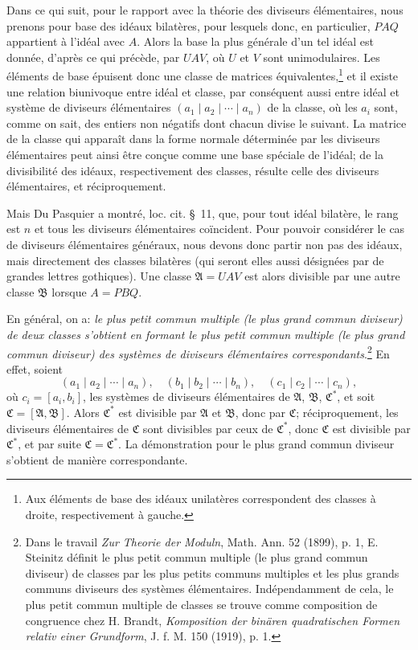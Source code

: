 Dans ce qui suit, pour le rapport avec la théorie des diviseurs élémentaires, nous prenons pour base des idéaux bilatères, pour lesquels donc, en particulier, $PAQ$ appartient à l'idéal avec $A$. Alors la base la plus générale d'un tel idéal est donnée, d'après ce qui précède, par $UAV$, où $U$ et $V$ sont unimodulaires. Les éléments de base épuisent donc une classe de matrices équivalentes,\footnote{Aux éléments de base des idéaux unilatères correspondent des classes à droite, respectivement à gauche.} et il existe une relation biunivoque entre idéal et classe, par conséquent aussi entre idéal et système de diviseurs élémentaires $(a_1\mid a_2\mid\cdots\mid a_n)$ de la classe, où les $a_i$ sont, comme on sait, des entiers non négatifs dont chacun divise le suivant. La matrice de la classe qui apparaît dans la forme normale déterminée par les diviseurs élémentaires peut ainsi être conçue comme une base spéciale de l'idéal; de la divisibilité des idéaux, respectivement des classes, résulte celle des diviseurs élémentaires, et réciproquement.

Mais Du Pasquier a montré, loc. cit. \S~11, que, pour tout idéal bilatère, le rang est $n$ et tous les diviseurs élémentaires coïncident. Pour pouvoir considérer le cas de diviseurs élémentaires généraux, nous devons donc partir non pas des idéaux, mais directement des classes bilatères (qui seront elles aussi désignées par de grandes lettres gothiques). Une classe $\mathfrak A=UAV$ est alors divisible par une autre classe $\mathfrak B$ lorsque $A=PBQ$.

En général, on a: \emph{le plus petit commun multiple (le plus grand commun diviseur) de deux classes s'obtient en formant le plus petit commun multiple (le plus grand commun diviseur) des systèmes de diviseurs élémentaires correspondants}.\footnote{Dans le travail \emph{Zur Theorie der Moduln}, Math. Ann. 52 (1899), p. 1, E. Steinitz définit le plus petit commun multiple (le plus grand commun diviseur) de classes par les plus petits communs multiples et les plus grands communs diviseurs des systèmes élémentaires. Indépendamment de cela, le plus petit commun multiple de classes se trouve comme \og composition de congruence \fg{} chez H. Brandt, \emph{Komposition der binären quadratischen Formen relativ einer Grundform}, J. f. M. 150 (1919), p. 1.} En effet, soient
\[
 (a_1\mid a_2\mid\cdots\mid a_n),\quad
 (b_1\mid b_2\mid\cdots\mid b_n),\quad
 (c_1\mid c_2\mid\cdots\mid c_n),
\]
où $c_i=[a_i,b_i]$, les systèmes de diviseurs élémentaires de $\mathfrak A$, $\mathfrak B$, $\mathfrak C^*$, et soit $\mathfrak C=[\mathfrak A,\mathfrak B]$. Alors $\mathfrak C^*$ est divisible par $\mathfrak A$ et $\mathfrak B$, donc par $\mathfrak C$; réciproquement, les diviseurs élémentaires de $\mathfrak C$ sont divisibles par ceux de $\mathfrak C^*$, donc $\mathfrak C$ est divisible par $\mathfrak C^*$, et par suite $\mathfrak C=\mathfrak C^*$. La démonstration pour le plus grand commun diviseur s'obtient de manière correspondante.

